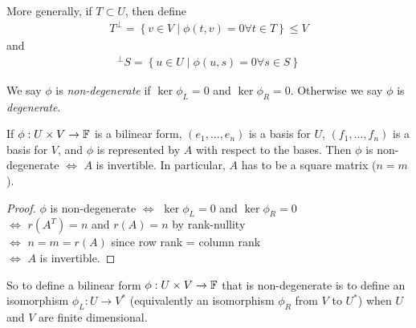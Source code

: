 \documentclass[a4paper]{article}
\begin{document}
More generally, if $T \subset U$, then define
\begin{equation*}
\begin{aligned}
T^\perp = \left\{v\in V \mid \phi\left(t,v\right) = 0 \forall t\in T\right\} \leq V
\end{aligned}
\end{equation*}
and
\begin{equation*}
\begin{aligned}
^\perp S = \left\{ u \in U \mid\phi\left(u,s\right) = 0 \forall s \in S\right\}
\end{aligned}
\end{equation*}

\begin{defi}
We say $\phi$ is \emph{non-degenerate} if $\ker \phi_L = 0$ and $\ker \phi_R = 0$. Otherwise we say $\phi$ is \emph{degenerate}.
\end{defi}

\begin{lemma}
If $\phi: U \times V \to \mathbb{F}$ is a bilinear form, $\left(e_1,...,e_n\right)$ is a basis for $U$, $\left(f_1,...,f_n\right)$ is a basis for $V$, and $\phi$ is represented by $A$ with respect to the bases. Then $\phi$ is non-degenerate $\iff$ $A$ is invertible. In particular, $A$ has to be a square matrix ($n=m$).
\begin{proof}
$\phi$ is non-degenerate $\iff$ $\ker \phi_L = 0$ and $\ker \phi_R = 0$\\
$\iff$ $r\left(A^T\right) = n$ and $r\left(A\right) = n$ by rank-nullity\\
$\iff$ $n=m=r\left(A\right)$ since row rank = column rank\\
$\iff$ $A$ is invertible.
\end{proof}
\end{lemma}

So to define a bilinear form $\phi: U\times V \to \mathbb{F}$ that is non-degenerate is to define an isomorphism $\phi_L: U \to V^*$ (equivalently an isomorphism $\phi_R$ from $V$ to $U^*$) when $U$ and $V$ are finite dimensional.
\end{document}
